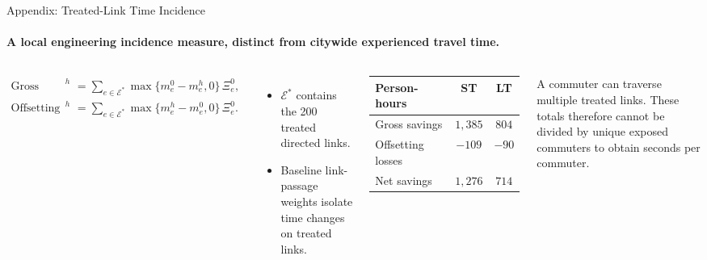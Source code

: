 \documentclass[11pt,aspectratio=169]{beamer}
\newcommand{\navback}[1]{\par\vspace{0.35em}\noindent\hfill\hyperlink{#1}{\beamerreturnbutton{back}}}
\begin{document}
\begin{frame}[label=apptreatedtime]{Appendix: Treated-Link Time Incidence}
\framesubtitle{A local engineering incidence measure, distinct from citywide experienced travel time.}
\begin{columns}[T,onlytextwidth]
\scriptsize
\begin{align*}
\text{Gross savings}^{h}
  &=\sum_{e\in\mathcal E^*}\max\{m_e^0-m_e^h,0\}\,\Xi_e^0,\\
\text{Offsetting losses}^{h}
  &=\sum_{e\in\mathcal E^*}\max\{m_e^h-m_e^0,0\}\,\Xi_e^0.
\end{align*}
\begin{itemize}\scriptsize
  \item $\mathcal E^*$ contains the 200 treated directed links.
  \item Baseline link-passage weights isolate time changes on treated links.
\end{itemize}
\centering\scriptsize
\begin{tabular}{lcc}
\toprule
Person-hours & ST & LT \\
\midrule
Gross savings & $1{,}385$ & $804$ \\
Offsetting losses & $-109$ & $-90$ \\
Net savings & $1{,}276$ & $714$ \\
\bottomrule
\end{tabular}
\vspace{0.55em}

\raggedright\scriptsize A commuter can traverse multiple treated links. These totals therefore cannot be divided by unique exposed commuters to obtain seconds per commuter.
\end{columns}
\navback{result2}
\end{frame}
\end{document}

